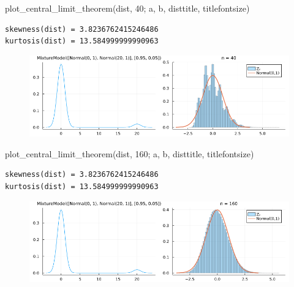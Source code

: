 \documentclass[
  letterpaper,
  DIV=11,
  numbers=noendperiod]{scrartcl}
\newenvironment{Shaded}{\begin{snugshade}}{\end{snugshade}}
\newcommand{\FloatTok}[1]{\textcolor[rgb]{0.68,0.00,0.00}{#1}}
\newcommand{\FunctionTok}[1]{\textcolor[rgb]{0.28,0.35,0.67}{#1}}
\newcommand{\NormalTok}[1]{\textcolor[rgb]{0.00,0.23,0.31}{#1}}
\begin{document}
\begin{Shaded}
\begin{Highlighting}[]
\FunctionTok{plot\_central\_limit\_theorem}\NormalTok{(dist, }\FloatTok{40}\NormalTok{; a, b, disttitle, titlefontsize)}
\end{Highlighting}
\end{Shaded}

\begin{verbatim}
skewness(dist) = 3.8236762415246486
kurtosis(dist) = 13.584999999990963
\end{verbatim}

\begin{figure}[H]

{\centering \includegraphics{05 Central limit theorem_files/figure-pdf/cell-88-output-2.png}

}

\end{figure}

\begin{Shaded}
\begin{Highlighting}[]
\FunctionTok{plot\_central\_limit\_theorem}\NormalTok{(dist, }\FloatTok{160}\NormalTok{; a, b, disttitle, titlefontsize)}
\end{Highlighting}
\end{Shaded}

\begin{verbatim}
skewness(dist) = 3.8236762415246486
kurtosis(dist) = 13.584999999990963
\end{verbatim}

\begin{figure}[H]

{\centering \includegraphics{05 Central limit theorem_files/figure-pdf/cell-89-output-2.png}

}

\end{figure}
\end{document}
